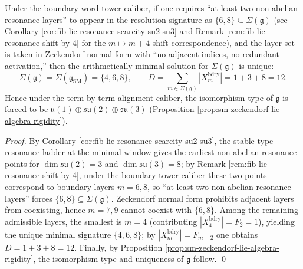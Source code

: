 \begin{corollary}\label{cor:sm-minimal-triple-selection-law}
Under the boundary word tower caliber, if one requires ``at least two non-abelian resonance layers'' to appear in the resolution signature as
\(
\{6,8\}\subseteq \Sigma(\mathfrak g)
\)
(see Corollary \ref{cor:fib-lie-resonance-scarcity-su2-su3} and Remark \ref{rem:fib-lie-resonance-shift-by-4} for the \(m\mapsto m+4\) shift correspondence), and the layer set is taken in Zeckendorf normal form with ``no adjacent indices, no redundant activation,''
then the arithmetically minimal solution for \(\Sigma(\mathfrak g)\) is unique:
\[
\Sigma(\mathfrak g)=\Sigma(\mathfrak g_{\mathrm{SM}})=\{4,6,8\},
\qquad
D=\sum_{m\in\Sigma(\mathfrak g)}|X_m^{\mathrm{bdry}}|=1+3+8=12.
\]
Hence under the term-by-term alignment caliber, the isomorphism type of \(\mathfrak g\) is forced to be
\(
\mathfrak u(1)\oplus\mathfrak{su}(2)\oplus\mathfrak{su}(3)
\)
(Proposition \ref{prop:sm-zeckendorf-lie-algebra-rigidity}).
\end{corollary}
\begin{proof}
By Corollary \ref{cor:fib-lie-resonance-scarcity-su2-su3}, the stable type resonance ladder at the minimal window gives the earliest non-abelian resonance points for \(\dim\mathfrak{su}(2)=3\) and \(\dim\mathfrak{su}(3)=8\);
by Remark \ref{rem:fib-lie-resonance-shift-by-4}, under the boundary tower caliber these two points correspond to boundary layers \(m=6,8\), so ``at least two non-abelian resonance layers'' forces \(\{6,8\}\subseteq\Sigma(\mathfrak g)\).
Zeckendorf normal form prohibits adjacent layers from coexisting, hence \(m=7,9\) cannot coexist with \(\{6,8\}\).
Among the remaining admissible layers, the smallest is \(m=4\) (contributing \(|X_4^{\mathrm{bdry}}|=F_2=1\)), yielding the unique minimal signature \(\{4,6,8\}\);
by \(|X_m^{\mathrm{bdry}}|=F_{m-2}\) one obtains \(D=1+3+8=12\).
Finally, by Proposition \ref{prop:sm-zeckendorf-lie-algebra-rigidity}, the isomorphism type and uniqueness of \(\mathfrak g\) follow. \qed
\end{proof}

